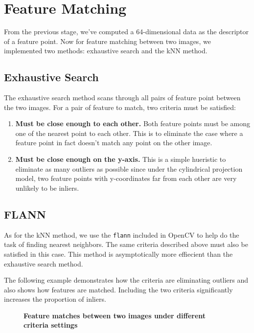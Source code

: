 \documentclass[a4paper]{article}
\begin{document}
\section{Feature Matching}
From the previous stage, we've computed a 64-dimensional data as the descriptor
of a feature point. Now for feature matching between two images, we implemented
two methods: exhaustive search and the kNN method.

\subsection{Exhaustive Search}
The exhaustive search method scans through all pairs of feature point between the
two images. For a pair of feature to match, two criteria must be satisfied:

\begin{enumerate}
  \item {\bf Must be close enough to each other.} Both feature points must be among
    one of the nearest point to each other. This is to eliminate the case where
    a feature point in fact doesn't match any point on the other image.
  \item {\bf Must be close enough on the y-axis.} This is a simple hueristic to
    eliminate as many outliers as possible since under the cylindrical projection
    model, two feature points with y-coordinates far from each other are very unlikely
    to be inliers.
\end{enumerate}

\subsection{FLANN}
As for the kNN method, we use the \texttt{flann} included in OpenCV to help do
the task of finding nearest neighbors. The same criteria described above must
also be satisfied in this case. This method is asymptotically more effiecient than
the exhaustive search method.

The following example demonstrates how the criteria are eliminating outliers and
also shows how features are matched. Including the two criteria significantly
increases the proportion of inliers.

\begin{figure}[h]
  \centering
  \hfill
  \hfill
  \caption{\textbf{Feature matches between two images under different criteria settings}}
  \label{fig:featMatch}
\end{figure}
\end{document}
